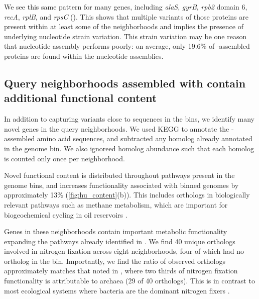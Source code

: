 We see this same pattern for many genes, including {\em alaS}, {\em gyrB},
{\em rpb2}
domain 6, {\em recA}, {\em rplB}, and {\em rpsC} ().
This shows that multiple variants of those proteins are present within
at least some of the neighborhoods and implies the presence of
underlying nucleotide strain variation.
This strain variation may be
one reason that nucleotide assembly performs poorly: on average, only
19.6\% of \plass-assembled proteins are found within the nucleotide
assemblies.

\subsection*{Query neighborhoods assembled with \plass contain additional functional content}

In addition to capturing variants close to sequences in the bins, we
identify many novel genes in the query neighborhoods. We used KEGG to
annotate the \plass-assembled amino acid sequences, and subtracted any
homolog already annotated in the genome bin.
We also ignoreed homolog abundance such that each homolog is counted only
once per neighborhood.

Novel functional content is distributed throughout pathways present in
the genome bins, and increases functionality associated with binned
genomes by approximately 13\% (\autoref{fig:hu_content}(b)).  This
includes orthologs in biologically relevant pathways
such as methane metabolism, which are important for biogeochemical
cycling in oil reservoirs \cite{Hu2016}.

Genes in these neighborhoods contain important metabolic functionality expanding
the pathways already identified in \cite{Hu2016}. We find 40
unique orthologs involved in nitrogen fixation across eight
neighborhoods, four of which had no ortholog in the bin.  Importantly,
we find the ratio of observed orthologs approximately matches that
noted in \cite{Hu2016}, where two thirds of nitrogen fixation
functionality is attributable to archaea (29 of 40 orthologs). This is
in contrast to most ecological systems where bacteria are the dominant
nitrogen fixers \cite{Hu2016}.
